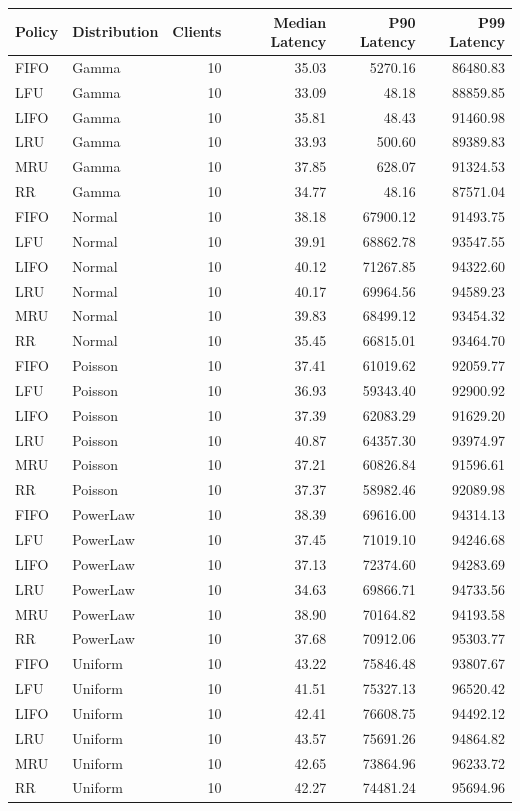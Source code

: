 \begin{tabular}{llrrrr}
\toprule
Policy & Distribution & Clients & Median Latency & P90 Latency & P99 Latency \\
\midrule
FIFO & Gamma & 10 & 35.03 & 5270.16 & 86480.83 \\
LFU & Gamma & 10 & 33.09 & 48.18 & 88859.85 \\
LIFO & Gamma & 10 & 35.81 & 48.43 & 91460.98 \\
LRU & Gamma & 10 & 33.93 & 500.60 & 89389.83 \\
MRU & Gamma & 10 & 37.85 & 628.07 & 91324.53 \\
RR & Gamma & 10 & 34.77 & 48.16 & 87571.04 \\
FIFO & Normal & 10 & 38.18 & 67900.12 & 91493.75 \\
LFU & Normal & 10 & 39.91 & 68862.78 & 93547.55 \\
LIFO & Normal & 10 & 40.12 & 71267.85 & 94322.60 \\
LRU & Normal & 10 & 40.17 & 69964.56 & 94589.23 \\
MRU & Normal & 10 & 39.83 & 68499.12 & 93454.32 \\
RR & Normal & 10 & 35.45 & 66815.01 & 93464.70 \\
FIFO & Poisson & 10 & 37.41 & 61019.62 & 92059.77 \\
LFU & Poisson & 10 & 36.93 & 59343.40 & 92900.92 \\
LIFO & Poisson & 10 & 37.39 & 62083.29 & 91629.20 \\
LRU & Poisson & 10 & 40.87 & 64357.30 & 93974.97 \\
MRU & Poisson & 10 & 37.21 & 60826.84 & 91596.61 \\
RR & Poisson & 10 & 37.37 & 58982.46 & 92089.98 \\
FIFO & PowerLaw & 10 & 38.39 & 69616.00 & 94314.13 \\
LFU & PowerLaw & 10 & 37.45 & 71019.10 & 94246.68 \\
LIFO & PowerLaw & 10 & 37.13 & 72374.60 & 94283.69 \\
LRU & PowerLaw & 10 & 34.63 & 69866.71 & 94733.56 \\
MRU & PowerLaw & 10 & 38.90 & 70164.82 & 94193.58 \\
RR & PowerLaw & 10 & 37.68 & 70912.06 & 95303.77 \\
FIFO & Uniform & 10 & 43.22 & 75846.48 & 93807.67 \\
LFU & Uniform & 10 & 41.51 & 75327.13 & 96520.42 \\
LIFO & Uniform & 10 & 42.41 & 76608.75 & 94492.12 \\
LRU & Uniform & 10 & 43.57 & 75691.26 & 94864.82 \\
MRU & Uniform & 10 & 42.65 & 73864.96 & 96233.72 \\
RR & Uniform & 10 & 42.27 & 74481.24 & 95694.96 \\
\bottomrule
\end{tabular}

